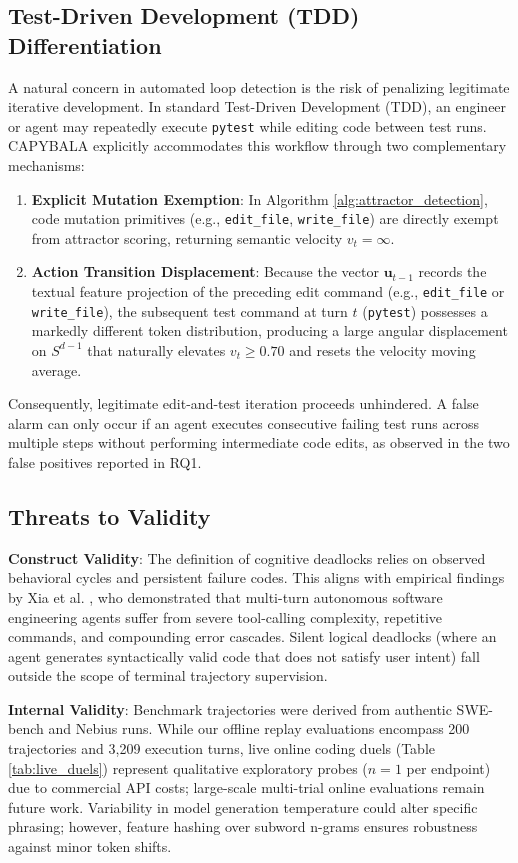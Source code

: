 \documentclass[journal]{IEEEtran}
\begin{document}
\subsection{Test-Driven Development (TDD) Differentiation}
A natural concern in automated loop detection is the risk of penalizing legitimate iterative development. In standard Test-Driven Development (TDD), an engineer or agent may repeatedly execute \texttt{pytest} while editing code between test runs. CAPYBALA explicitly accommodates this workflow through two complementary mechanisms:
\begin{enumerate}[leftmargin=12pt, topsep=2pt, itemsep=1pt]
    \item \textbf{Explicit Mutation Exemption}: In Algorithm \ref{alg:attractor_detection}, code mutation primitives (e.g., \texttt{edit\_file}, \texttt{write\_file}) are directly exempt from attractor scoring, returning semantic velocity $v_t = \infty$.
    \item \textbf{Action Transition Displacement}: Because the vector $\mathbf{u}_{t-1}$ records the textual feature projection of the preceding edit command (e.g., \texttt{edit\_file} or \texttt{write\_file}), the subsequent test command at turn $t$ (\texttt{pytest}) possesses a markedly different token distribution, producing a large angular displacement on $S^{d-1}$ that naturally elevates $v_t \ge 0.70$ and resets the velocity moving average.
\end{enumerate}
Consequently, legitimate edit-and-test iteration proceeds unhindered. A false alarm can only occur if an agent executes consecutive failing test runs across multiple steps without performing intermediate code edits, as observed in the two false positives reported in RQ1.

\subsection{Threats to Validity}
\textbf{Construct Validity}: The definition of cognitive deadlocks relies on observed behavioral cycles and persistent failure codes. This aligns with empirical findings by Xia et al. \cite{xia2025demystifying}, who demonstrated that multi-turn autonomous software engineering agents suffer from severe tool-calling complexity, repetitive commands, and compounding error cascades. Silent logical deadlocks (where an agent generates syntactically valid code that does not satisfy user intent) fall outside the scope of terminal trajectory supervision.

\textbf{Internal Validity}: Benchmark trajectories were derived from authentic SWE-bench and Nebius runs. While our offline replay evaluations encompass 200 trajectories and 3,209 execution turns, live online coding duels (Table \ref{tab:live_duels}) represent qualitative exploratory probes ($n=1$ per endpoint) due to commercial API costs; large-scale multi-trial online evaluations remain future work. Variability in model generation temperature could alter specific phrasing; however, feature hashing over subword n-grams ensures robustness against minor token shifts.
\end{document}
